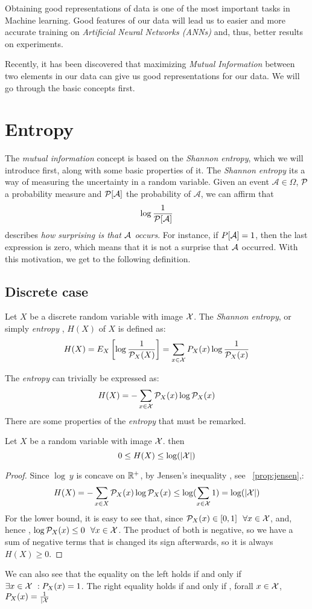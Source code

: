 Obtaining good representations of data is one of the most important tasks in Machine learning. Good features of our data will lead us to easier and more accurate training on \emph{Artificial Neural Networks (ANNs)} and, thus, better results on experiments.

Recently, it has been discovered that maximizing \emph{Mutual Information} between two elements in our data can give us good representations for our data. We will go through the basic concepts first.


\section{Entropy}

The \emph{mutual information} concept is based on the \emph{Shannon entropy}, which we will introduce first, along with some basic properties of it. The \emph{Shannon entropy} its a way of measuring the uncertainty in a random variable. Given an event $\mathcal A \in \Omega$, $\mathcal{P}$ a probability measure and $\mathcal{P}[\mathcal A]$ the probability of $\mathcal A$, we can affirm that 
$$
\log\frac{1}{\mathcal{P}[\mathcal A]}
$$
describes \emph{how surprising is that $\mathcal A$ occurs}. For instance, if $P[\mathcal A] = 1$, then the last expression is zero, which means that it is not a surprise that $\mathcal A$ occurred. With this motivation, we get to the following definition.

\subsection{Discrete case}

\begin{ndef}
Let $X$ be a discrete random variable with image $\mathcal{X}$. The \emph{Shannon entropy}, or simply \emph{entropy} , $H(X)$ of $X$ is defined as:
$$
H(X) = E_X\left[\log\frac{1}{\mathcal{P}_X(X)}\right] =  \sum_{x \in \mathcal{X}} P_X(x) \log\frac{1}{\mathcal{P}_X(x)}
$$
\end{ndef}
The \emph{entropy} can trivially be expressed as:
$$
H(X) = - \sum_{x \in \mathcal{X}}\mathcal{P}_X (x)\log \mathcal{P}_X(x)
$$
There are some properties of the \emph{entropy} that must be remarked. 
\begin{nprop}
    Let $X$ be a random variable with image $\mathcal{X}$. then
    $$
0 \leq H(X) \leq \log(|\mathcal{X}|)
    $$
\end{nprop}
\begin{proof}
    Since $\log \ y$ is concave on $\mathbb{R}^+$, by Jensen's inequality , see ~\ref{prop:jensen},:
    $$
    H(X) = - \sum_{x \in X}\mathcal{P}_X (x)\log \mathcal{P}_X(x) \leq \log(\sum_{x \in \mathcal{X}} 1) = \log(|\mathcal{X}|)
    $$
    For the lower bound, it is easy to see that, since $\mathcal{P}_X(x) \in [0,1] \ \  \forall x \in \mathcal{X} $, and, hence , $\log \mathcal{P}_X(x) \leq 0 \ \ \forall x \in \mathcal{X}$. The product of both is negative, so we have a sum of negative terms that is changed its sign afterwards, so it is always $H(X) \geq 0$. 
\end{proof}
We can also see that the equality on the left holds if and only if $\exists x \in \mathcal{X} \ : P_X(x) = 1$. The right equality holds if and only if , forall $x \in \mathcal{X}$, $P_X(x) = \frac{1}{|\mathcal{X}}$


